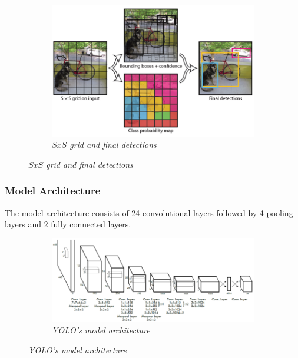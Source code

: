 \begin{figure}[H]
    \centering
    \begin{subfigure}[b]{0.6\textwidth}
        \centering
        \includegraphics[width=\textwidth]{Figures/2. Related Work/yolo_3.png}
        \caption{\textit{$SxS$ grid and final detections} \cite{yolo_images}}
    \end{subfigure}
\end{figure}

\subsubsection{Model Architecture}
The model architecture consists of 24 convolutional layers followed by 4 pooling layers and 2
fully connected layers.

\begin{figure}[H]
    \centering
    \begin{subfigure}[b]{0.8\textwidth}
        \centering
        \includegraphics[width=\textwidth]{Figures/2. Related Work/yolo_4.png}
        \caption{\textit{YOLO's model architecture} \cite{yolo_images}}
    \end{subfigure}
\end{figure}

